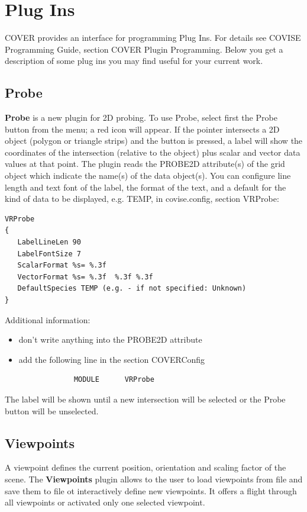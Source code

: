\section{Plug Ins}
\label{Plug_Ins}


COVER provides an interface for programming Plug Ins. For details see COVISE Programming Guide,
section COVER Plugin Programming. Below you get a description of some plug ins you may find useful for
your current work.

\subsection{Probe}

{\bf Probe} is a new plugin for 2D probing. To use Probe, select first the Probe button from
the menu; a red icon will appear. If the pointer intersects a 2D object (polygon or 
triangle strips) and the button is pressed, a label will show the coordinates of the 
intersection (relative to the object) plus scalar and vector data values at that point.
The plugin reads the PROBE2D attribute(s) of the grid object which indicate the 
name(s) of the data object(s). You can configure line length and text font of the 
label, the format of the text, and a default for the kind of data to be displayed,
e.g. TEMP, in covise.config, section VRProbe:
\begin{verbatim}
VRProbe
{
   LabelLineLen 90
   LabelFontSize 7
   ScalarFormat %s= %.3f
   VectorFormat %s= %.3f  %.3f %.3f
   DefaultSpecies TEMP (e.g. - if not specified: Unknown)
}
\end{verbatim}
Additional information:
\begin{itemize}
\item don't write anything into the PROBE2D attribute
\item add the following line in the section COVERConfig 
\begin{verbatim}
             MODULE      VRProbe
\end{verbatim}
\end{itemize}
The label will be shown until a new intersection will be selected or the
Probe button will be unselected.

\subsection{Viewpoints}

A viewpoint defines the current position, orientation and scaling factor of the
scene. 
The {\bf Viewpoints} plugin allows to the user to load viewpoints from file
and save them to file ot interactively define new viewpoints. It offers a flight
through all viewpoints or activated only one selected viewpoint. 

